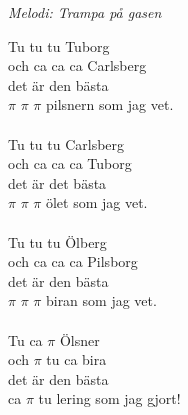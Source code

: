 {\footnotesize\textit{Melodi: Trampa på gasen}}
\vspace{10pt}

Tu tu tu Tuborg\\
och ca ca ca Carlsberg\\
det är den bästa\\
$\pi$ $\pi$ $\pi$ pilsnern som jag vet.\\
\\
Tu tu tu Carlsberg\\
och ca ca ca Tuborg\\
det är det bästa\\
$\pi$ $\pi$ $\pi$ ölet som jag vet.\\
\\
Tu tu tu Ölberg\\
och ca ca ca Pilsborg\\
det är den bästa\\
$\pi$ $\pi$ $\pi$ biran som jag vet.\\
\\
Tu ca $\pi$ Ölsner\\
och $\pi$ tu ca bira\\
det är den bästa\\
ca $\pi$ tu lering som jag gjort!
